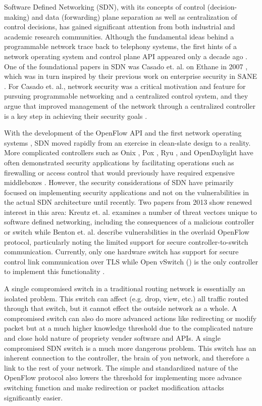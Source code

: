 Software Defined Networking (SDN), with its concepts of control (decision-making) and data (forwarding) plane separation as well as centralization of control decisions, has gained significant attention from both industrial and academic research communities.  Although the fundamental ideas behind a programmable network trace back to telephony systems, the first hints of a network operating system and control plane API appeared only a decade ago \cite{history}.  One of the foundational papers in SDN was Casado et. al. on Ethane in 2007 \cite{ethane}, which was in turn inspired by their previous work on enterprise security in SANE \cite{sane}.  For Casado et. al., network security was a critical motivation and feature for pursuing programmable networking and a centralized control system, and they argue that improved management of the network through a centralized controller is a key step in achieving their security goals \cite{ethane}.

With the development of the OpenFlow API and the first network operating systems \cite{openflow}\cite{nox}, SDN moved rapidly from an exercise in clean-slate design to a reality.  More complicated controllers such as Onix \cite{onix}, Pox \cite{pox}, Ryu \cite{ryu}, and OpenDaylight\cite{opendaylight} have often demonstrated security applications by facilitating operations such as firewalling or access control that would previously have required expensive middleboxes \cite{resonance}.  However, the security considerations of SDN have primarily focused on implementing security applications and not on the vulnerabilities in the actual SDN architecture until recently. Two papers from 2013 show renewed interest in this area: Kreutz et. al. examines a number of threat vectors unique to software defined networking, including the consequences of a malicious controller or switch \cite{sdnsec} while Benton et. al. describe vulnerabilities in the overlaid OpenFlow protocol, particularly noting the limited support for secure controller-to-switch communication. Currently, only one hardware switch has support for secure control link communication over TLS while Open vSwitch (\cite{openvswitch}) is the only controller to implement this functionality \cite{benton}. 

A single compromised switch in a traditional routing network is essentially an isolated problem. This switch can affect (e.g. drop, view, etc.) all traffic routed through that switch, but it cannot effect the outside network as a whole. A compromised switch can also do more advanced actions like redirecting or modify packet but at a much higher knowledge threshold due to the complicated nature and close hold nature of propriety vender software and APIs. A single compromised SDN switch is a much more dangerous problem. This switch has an inherent connection to the controller, the brain of you network, and therefore a link to the rest of your network. The simple and standardized nature of the OpenFlow protocol also lowers the threshold for implementing more advance switching function and make redirection or packet modification attacks significantly easier. 

